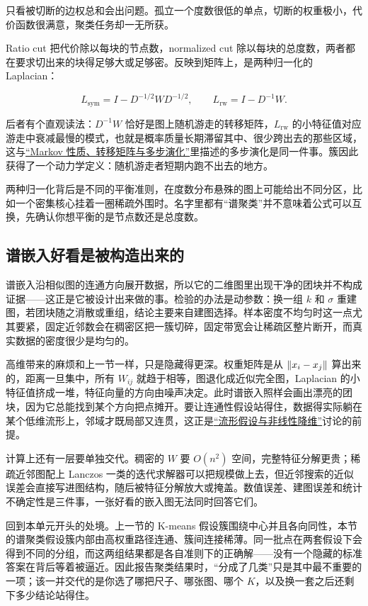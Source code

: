只看被切断的边权总和会出问题。孤立一个度数很低的单点，切断的权重极小，代价函数很满意，聚类任务却一无所获。

Ratio cut 把代价除以每块的节点数，normalized cut 除以每块的总度数，两者都在要求切出来的块得足够大或足够密。反映到矩阵上，是两种归一化的 Laplacian：

\[
L_{\mathrm{sym}}=I-D^{-1/2}WD^{-1/2},
\qquad
L_{\mathrm{rw}}=I-D^{-1}W .
\]

后者有个直观读法：\(D^{-1}W\) 恰好是图上随机游走的转移矩阵，\(L_{\mathrm{rw}}\) 的小特征值对应游走中衰减最慢的模式，也就是概率质量长期滞留其中、很少跨出去的那些区域，这与\hyperref[sec:06-Random-Processes/03-Markov-Chains/01]{``Markov 性质、转移矩阵与多步演化''}里描述的多步演化是同一件事。簇因此获得了一个动力学定义：随机游走者短期内跑不出去的地方。

两种归一化背后是不同的平衡准则，在度数分布悬殊的图上可能给出不同分区，比如一个密集核心挂着一圈稀疏外围时。名字里都有``谱聚类''并不意味着公式可以互换，先确认你想平衡的是节点数还是总度数。

\subsection{谱嵌入好看是被构造出来的}

谱嵌入沿相似图的连通方向展开数据，所以它的二维图里出现干净的团块并不构成证据——这正是它被设计出来做的事。检验的办法是动参数：换一组 \(k\) 和 \(\sigma\) 重建图，若团块随之消散或重组，结论主要来自建图选择。样本密度不均匀时这一点尤其要紧，固定近邻数会在稠密区把一簇切碎，固定带宽会让稀疏区整片断开，而真实数据的密度很少是均匀的。

高维带来的麻烦和上一节一样，只是隐藏得更深。权重矩阵是从 \(\left\lVert x_i-x_j\right\rVert\) 算出来的，距离一旦集中，所有 \(W_{ij}\) 就趋于相等，图退化成近似完全图，Laplacian 的小特征值挤成一堆，特征向量的方向由噪声决定。此时谱嵌入照样会画出漂亮的团块，因为它总能找到某个方向把点摊开。要让连通性假设站得住，数据得实际躺在某个低维流形上，邻域才既局部又连贯，这正是\hyperref[sec:13-Machine-Learning/04-Dimensionality-Reduction/04]{``流形假设与非线性降维''}讨论的前提。

计算上还有一层要单独交代。稠密的 \(W\) 要 \(O(n^2)\) 空间，完整特征分解更贵；稀疏近邻图配上 Lanczos 一类的迭代求解器可以把规模做上去，但近邻搜索的近似误差会直接写进图结构，随后被特征分解放大或掩盖。数值误差、建图误差和统计不确定性是三件事，一张好看的嵌入图无法同时回答它们。

回到本单元开头的处境。上一节的 K-means 假设簇围绕中心并且各向同性，本节的谱聚类假设簇内部由高权重路径连通、簇间连接稀薄。同一批点在两套假设下会得到不同的分组，而这两组结果都是各自准则下的正确解——没有一个隐藏的标准答案在背后等着被逼近。因此报告聚类结果时，``分成了几类''只是其中最不重要的一项；该一并交代的是你选了哪把尺子、哪张图、哪个 \(K\)，以及换一套之后还剩下多少结论站得住。
